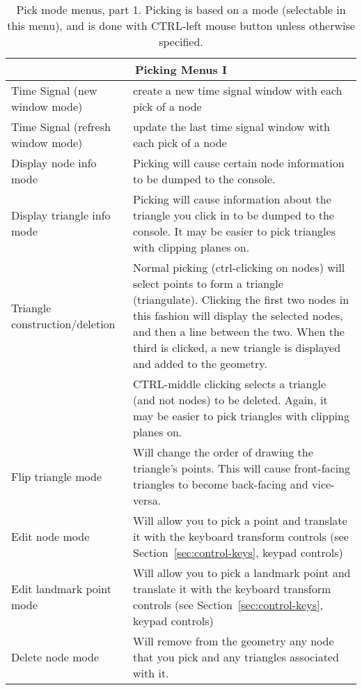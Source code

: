\begin{table}[ht]
  \begin{center}
    \begin{tabular}{|l|p{4 in}|} \hline
      \multicolumn{2}{|c|}{\textbf{Picking Menus I}} \\ \hline
      Time Signal (new window mode) & create a new time signal window with
      each pick of a node \\
      Time Signal (refresh window mode) & update the last time signal 
      window with each pick of a node \\
      Display node info mode & Picking will cause certain node information
      to be dumped to the console. \\
      Display triangle info mode & Picking will cause information about
      the triangle you click in to be dumped to the console.
      It may be easier to pick triangles with clipping planes on. \\
      Triangle construction/deletion & Normal picking (ctrl-clicking on nodes)
      will select points to form a triangle (triangulate).  Clicking the first 
      two nodes in this fashion will display the selected nodes, and then a 
      line between the two.  When the third is clicked, a new triangle is 
      displayed and added to the geometry. \\
      & CTRL-middle clicking selects a triangle (and not nodes) to be deleted.
      Again, it may be easier to pick triangles with clipping planes on. \\
      Flip triangle mode & Will change the order of drawing the triangle's
      points.  This will cause front-facing triangles to become back-facing
      and vice-versa. \\
      Edit node mode & Will allow you to pick a point and translate it
      with the keyboard transform controls (see
      Section~\ref{sec:control-keys}, keypad controls) \\
      Edit landmark point mode & Will allow you to pick a landmark point
      and translate it with the keyboard transform controls (see
      Section~\ref{sec:control-keys}, keypad controls) \\
      Delete node mode & Will remove from the geometry any node that you pick
      and any triangles associated with it. \\
      \hline
  \end{tabular}
\end{center}
\caption{\label{table:pickingone} Pick mode menus, part 1.  Picking is
  based on a 
  mode (selectable in this menu), and is done with CTRL-left mouse button
  unless otherwise specified.}
\end{table}

